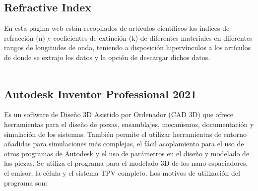\subsection{Refractive Index}
En esta página web están recopilados de artículos científicos los índices de refracción (\gls{n}) y coeficientes de extinción (\gls{k}) de diferentes materiales en diferentes rangos de longitudes de onda, teniendo a disposición hipervínculos a los artículos de donde se extrajo los datos y la opción de descargar dichos datos.\\\\

\subsection{Autodesk Inventor Professional 2021}
Es un software de Diseño 3D Asistido por Ordenador (CAD 3D) que ofrece herramientas para el diseño de piezas, ensamblajes, mecanismos, documentación y simulación de los sistemas. También permite el utilizar herramientas de entorno añadidas para simulaciones más complejas, el fácil acoplamiento para el uso de otros programas de Autodesk y el uso de parámetros en el diseño y modelado de las piezas.
Se utiliza el programa para el modelado 3D de los nano-espaciadores, el emisor, la célula y el sistema TPV completo. Los motivos de utilización del programa son:

